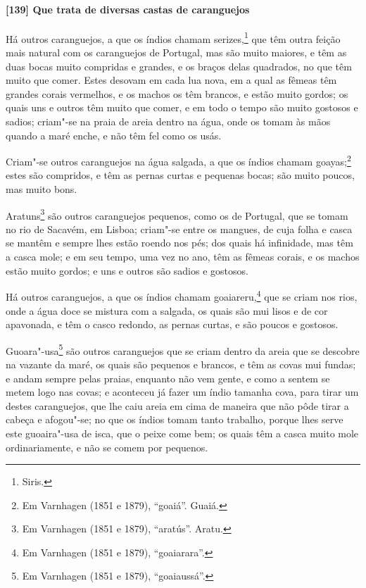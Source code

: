 \begin{linenumbers}
\paragraph{[139] Que trata de diversas castas de caranguejos}\quad
Há outros caranguejos, a que os índios chamam serizes,\footnote{ Siris.} que têm outra
feição mais natural com os caranguejos de Portugal, mas são muito maiores, e têm as duas
bocas muito compridas e grandes, e os braços delas quadrados, no que têm muito que comer.
Estes desovam em cada lua nova, em a qual as fêmeas têm grandes corais vermelhos, e os
machos os têm brancos, e estão muito gordos; os quais uns e outros têm muito que comer, e
em todo o tempo são muito gostosos e sadios; criam"-se na praia de areia dentro na água,
onde os tomam às mãos quando a maré enche, e não têm fel como os usás.

Criam"-se outros caranguejos na água salgada, a que os índios chamam goayas;\footnote{ Em
Varnhagen (1851 e 1879), ``goaiá''. Guaiá.} estes são compridos, e têm as pernas curtas e
pequenas bocas; são muito poucos, mas muito bons.

Aratuns\footnote{ Em Varnhagen (1851 e 1879), ``aratús''. Aratu.} são outros caranguejos
pequenos, como os de Portugal, que se tomam no rio de Sacavém, em Lisboa; criam"-se entre
os mangues, de cuja folha e casca se mantêm e sempre lhes estão roendo nos pés; dos quais
há infinidade, mas têm a casca mole; e em seu tempo, uma vez no ano, têm as fêmeas corais,
e os machos estão muito gordos; e uns e outros são sadios e gostosos.

Há outros caranguejos, a que os índios chamam goaiareru,\footnote{ Em Varnhagen (1851 e
1879), ``goaiarara''.} que se criam nos rios, onde a água doce se mistura com a salgada,
os quais são mui lisos e de cor apavonada, e têm o casco redondo, as pernas curtas, e são
poucos e gostosos.

Guoara"-usa\footnote{ Em Varnhagen (1851 e 1879), ``goaiaussá''.} são outros caranguejos
que se criam dentro da areia que se descobre na vazante da maré, os quais são pequenos e
brancos, e têm as covas mui fundas; e andam sempre pelas praias, enquanto não vem gente, e
como a sentem se metem logo nas covas; e aconteceu já fazer um índio tamanha cova, para
tirar um destes caranguejos, que lhe caiu areia em cima de maneira que não pôde tirar a
cabeça e afogou"-se; no que os índios tomam tanto trabalho, porque lhes serve este
guoaira"-usa de isca, que o peixe come bem; os quais têm a casca muito mole ordinariamente,
e não se comem por pequenos.


\end{linenumbers}
